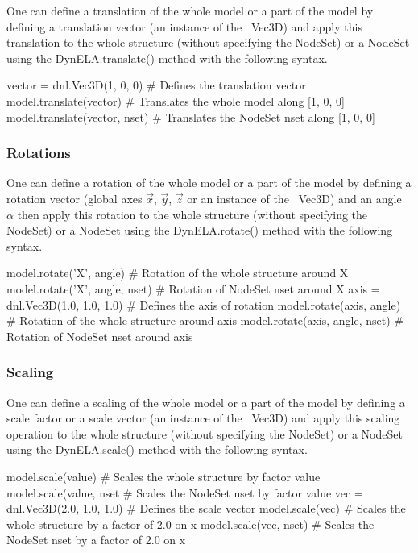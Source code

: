 One can define a translation of the whole model or a part of the model by defining a translation vector (an instance of the \DynELA~\textsf{Vec3D}) and apply this translation to the whole structure (without specifying the \textsf{NodeSet}) or a \textsf{NodeSet} using the \textsf{DynELA.translate()} method with the following syntax.

\begin{PythonListing}
vector = dnl.Vec3D(1, 0, 0)   # Defines the translation vector
model.translate(vector)       # Translates the whole model along [1, 0, 0]
model.translate(vector, nset) # Translates the NodeSet nset along [1, 0, 0]
\end{PythonListing}

\subsubsection{Rotations}

One can define a rotation of the whole model or a part of the model by defining a rotation vector (global axes $\overrightarrow{\ensuremath{x}}$, $\overrightarrow{y}$, $\overrightarrow{\ensuremath{z}}$ or an instance of the \DynELA~\textsf{Vec3D}) and an angle $\alpha$ then apply this rotation to the whole structure (without specifying the \textsf{NodeSet}) or a \textsf{NodeSet} using the \textsf{DynELA.rotate()} method with the following syntax.

\begin{PythonListing}
model.rotate('X', angle)        # Rotation of the whole structure around X
model.rotate('X', angle, nset)  # Rotation of NodeSet nset around X
axis = dnl.Vec3D(1.0, 1.0, 1.0) # Defines the axis of rotation
model.rotate(axis, angle)       # Rotation of the whole structure around axis
model.rotate(axis, angle, nset) # Rotation of NodeSet nset around axis
\end{PythonListing}

\subsubsection{Scaling}

One can define a scaling of the whole model or a part of the model by defining a scale factor or a scale vector (an instance of the \DynELA~\textsf{Vec3D}) and apply this scaling operation to the whole structure (without specifying the \textsf{NodeSet}) or a \textsf{NodeSet} using the \textsf{DynELA.scale()} method with the following syntax.

\begin{PythonListing}
model.scale(value)             # Scales the whole structure by factor value
model.scale(value, nset        # Scales the NodeSet nset by factor value
vec = dnl.Vec3D(2.0, 1.0, 1.0) # Defines the scale vector
model.scale(vec)               # Scales the whole structure by a factor of 2.0 on x
model.scale(vec, nset)         # Scales the NodeSet nset by a factor of 2.0 on x
\end{PythonListing}


